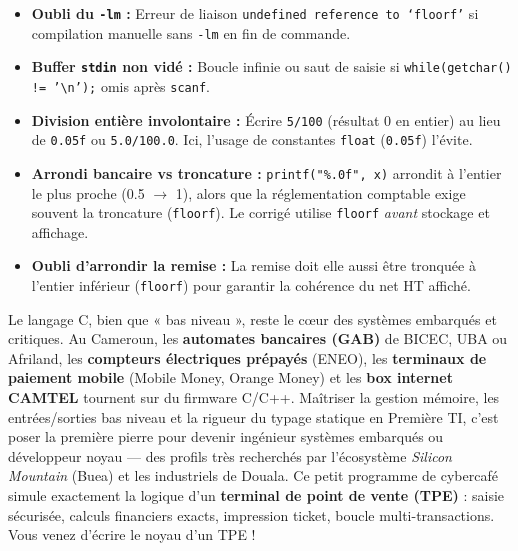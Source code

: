 \documentclass[11pt]{article}
\begin{document}
\begin{attention}
\begin{itemize}
    \item \textbf{Oubli du \texttt{-lm} :} Erreur de liaison \texttt{undefined reference to `floorf'} si compilation manuelle sans \texttt{-lm} en fin de commande.
    \item \textbf{Buffer \texttt{stdin} non vidé :} Boucle infinie ou saut de saisie si \texttt{while(getchar() != '\textbackslash n');} omis après \texttt{scanf}.
    \item \textbf{Division entière involontaire :} Écrire \texttt{5/100} (résultat 0 en entier) au lieu de \texttt{0.05f} ou \texttt{5.0/100.0}. Ici, l'usage de constantes \texttt{float} (\texttt{0.05f}) l'évite.
    \item \textbf{Arrondi bancaire vs troncature :} \texttt{printf("\%.0f", x)} arrondit à l'entier le plus proche (0.5 $\rightarrow$ 1), alors que la réglementation comptable exige souvent la troncature (\texttt{floorf}). Le corrigé utilise \texttt{floorf} \emph{avant} stockage et affichage.
    \item \textbf{Oubli d'arrondir la remise :} La remise doit elle aussi être tronquée à l'entier inférieur (\texttt{floorf}) pour garantir la cohérence du net HT affiché.
\end{itemize}
\end{attention}

\begin{savaistu}
Le langage C, bien que « bas niveau », reste le cœur des systèmes embarqués et critiques. Au Cameroun, les \textbf{automates bancaires (GAB)} de BICEC, UBA ou Afriland, les \textbf{compteurs électriques prépayés} (ENEO), les \textbf{terminaux de paiement mobile} (Mobile Money, Orange Money) et les \textbf{box internet CAMTEL} tournent sur du firmware C/C++. Maîtriser la gestion mémoire, les entrées/sorties bas niveau et la rigueur du typage statique en Première TI, c'est poser la première pierre pour devenir ingénieur systèmes embarqués ou développeur noyau — des profils très recherchés par l'écosystème \emph{Silicon Mountain} (Buea) et les industriels de Douala. Ce petit programme de cybercafé simule exactement la logique d'un \textbf{terminal de point de vente (TPE)} : saisie sécurisée, calculs financiers exacts, impression ticket, boucle multi-transactions. Vous venez d'écrire le noyau d'un TPE !
\end{savaistu}
\end{document}
